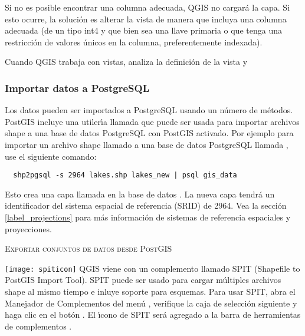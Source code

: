 Si no es posible encontrar una columna adecuada, QGIS no cargar\'a la capa. Si esto ocurre, la soluci\'on es alterar la vista de manera que incluya una columna adecuada (de un tipo int4 y que bien sea una llave primaria o que tenga una restricci\'on de valores \'unicos en la columna, preferentemente indexada). 

Cuando QGIS trabaja con vistas, analiza la definici\'on de la vista y 

\subsubsection{Importar datos a PostgreSQL}\label{sec:loading_postgis_data}  
Los datos pueden ser importados a PostgreSQL usando un n\'umero de m\'etodos. PostGIS
incluye una utiler\'{\i}a llamada  que puede ser usada para importar archivos shape a una base de datos PostgreSQL con PostGIS activado. Por ejemplo para importar un archivo shape llamado  a una base de datos PostgreSQL llamada , use el siguiente comando:

\begin{verbatim} 
  shp2pgsql -s 2964 lakes.shp lakes_new | psql gis_data
\end{verbatim}

Esto crea una capa llamada  en la base de datos . La nueva capa tendr\'a un identificador del sistema espacial de referencia (SRID) de 2964. Vea la secci\'on \ref{label_projections} para más informaci\'on de sistemas de referencia espaciales y proyecciones.

\begin{Tip}
\caption{\textsc{Exportar conjuntos de datos desde PostGIS}}
\end{Tip}

\texttt{[image: spiticon]} QGIS viene con un complemento llamado 
SPIT (Shapefile to PostGIS Import Tool).
SPIT puede ser usado para cargar m\'ultiples archivos shape al mismo tiempo e inluye soporte para esquemas. Para usar SPIT, abra el Manejador de Complementos del men\'u , verifique la caja de selecci\'on siguiente  y haga clic en el bot\'on . El \'{\i}cono de SPIT ser\'a agregado a la barra de herramientas de complementos . 


